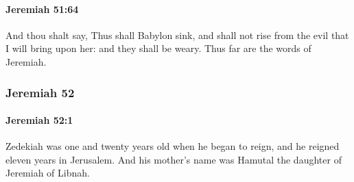 		\paragraph{Jeremiah 51:64} %
			\label{JEREMIAH-51-64}

			And thou shalt say, Thus shall Babylon sink, and shall not rise from the evil that I will bring upon her: and they shall be weary. Thus far are the words of Jeremiah.

	\subsubsection{Jeremiah 52} %
		\label{JEREMIAH-52}

		\paragraph{Jeremiah 52:1} %
			\label{JEREMIAH-52-1}

			Zedekiah was one and twenty years old when he began to reign, and he reigned eleven years in Jerusalem. And his mother’s name was Hamutal the daughter of Jeremiah of Libnah.

